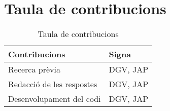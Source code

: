 \documentclass{article}
\begin{document}
\section{Taula de contribucions}
\begin{table}
    \begin{tabular}{|l|l|}
        Contribucions & Signa \\\hline\hline
        Recerca prèvia & DGV, JAP \\\hline
        Redacció de les respostes & DGV, JAP \\\hline
        Desenvolupament del codi & DGV, JAP \\\hline
    \end{tabular}
    \caption{Taula de contribucions}
    \label{table:contribucions}
\end{table}
\end{document}

